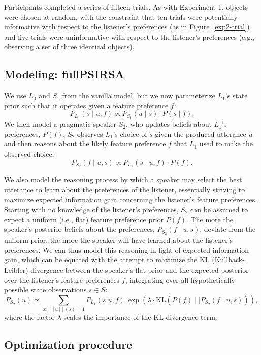 \documentclass[10pt,a4paper]{article}
\newcommand{\gcs}[1]{\textcolor{blue}{[gcs: #1]}}
\begin{document}
Participants completed a series of fifteen trials. As with Experiment 1, objects were chosen at random, with the constraint that ten trials were potentially informative with respect to the listener's preferences (as in Figure~\ref{exp2-trial}) and five trials were uninformative with respect to the listener's preferences (e.g., observing a set of three identical objects).


\subsection*{Modeling: fullPSIRSA}

We use $L_0$ and $S_1$ from the vanilla model, but we now parameterize $L_1$'s state prior such that it operates given a feature preference $f$:
$$P_{L_{1}}(s\mid u,f) \propto P_{S_{1}}(u \mid s) \cdot P(s \mid f).$$
We then model a pragmatic speaker $S_2$, who updates beliefs about $L_1$'s preferences, $P(f)$.
$S_2$ observes $L_1$'s choice of $s$ given the produced utterance $u$ and then reasons about the likely feature preference $f$ that $L_1$ used to make the observed choice:
$$P_{S_{2}}(f\mid u,s) \propto P_{L_{1}}(s \mid u,f) \cdot P(f).$$

We also model the reasoning process by which a speaker may select the best utterance to learn about the preferences of the listener, essentially striving to maximize expected information gain concerning the listener's feature preferences.
Starting with no knowledge of the listener's preferences, $S_2$ can be assumed to expect a uniform (i.e., flat) feature preference prior $P(f)$.
The more the speaker's posterior beliefs about the preferences, $P_{S_{2}}(f\mid u,s)$, deviate from the uniform prior, the more the speaker will have learned about the listener's preferences. 
We can thus model this reasoning in light of expected information gain, which can be equated with the attempt to maximize the KL (Kullback-Leibler) divergence between the speaker's flat prior and the expected posterior over the listener's feature preferences $f$, integrating over all hypothetically possible state observations $s \in S$: %
$$P_{S_2}(u) \propto \sum_{s:\  [\![u]\!](s)=1} P_{L_1}(s|u,f)\ \exp(\lambda \cdot \textrm{KL}(P(f)\mid\mid P_{S_{2}}(f\mid u,s))),$$
where the factor $\lambda$ scales the importance of the KL divergence term. 

\subsection*{Optimization procedure}
\end{document}

